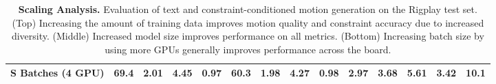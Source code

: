 \begin{table}[t]
{\begin{tabular}{l|cccc|cccc|ccccc}
S Batches (4 GPU) & 69.4 & 2.01 & 4.45 & 0.97 & 60.3 & 1.98 & 4.27 & \textbf{0.98} & 2.97 & 3.68 & 5.61 & 3.42 & 10.1 \\
\bottomrule
\end{tabular}%
}
\caption{\textbf{Scaling Analysis.} Evaluation of text and constraint-conditioned motion generation on the Rigplay test set. (Top) Increasing the amount of training data improves motion quality and constraint accuracy due to increased diversity. (Middle) Increased model size improves performance on all metrics. (Bottom) Increasing batch size by using more GPUs generally improves performance across the board.}
\label{table:scaling}
\end{table}